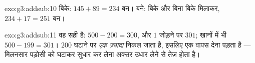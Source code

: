 \begin{solution}{exo:g3:addsub:10}
बिके: $145 + 89 = 234$ बन। बने: बिके और बिना बिके मिलाकर,
$234 + 17 = 251$ बन।
\end{solution}

\begin{solution}{exo:g3:addsub:11}
वह सही है: $500 - 200 = 300$, और $1$ जोड़ने पर $301$; खानों में
भी $500 - 199 = 301$। $200$ घटाने पर \emph{एक ज़्यादा} निकल
जाता है, इसलिए एक वापस देना पड़ता है --- मिलनसार पड़ोसी को घटाकर
सुधार कर लेना अक्सर उधार लेने से तेज़ होता है।
\end{solution}

